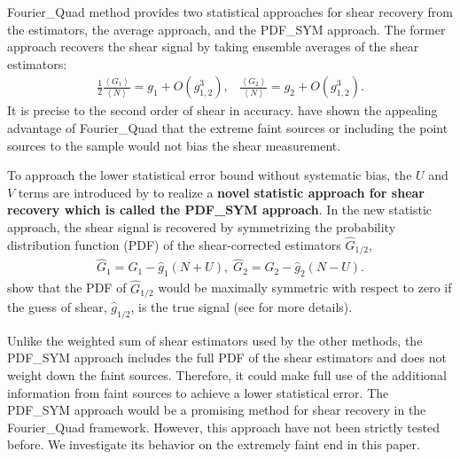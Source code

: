 \documentclass[twocolumn]{aastex62}
\begin{document}
Fourier\_Quad method provides two statistical approaches for shear recovery from the estimators, the average approach, and the PDF\_SYM approach. The former approach recovers the shear signal by taking ensemble averages of the shear estimators:
\begin{eqnarray}
\label{method:mean}
\frac{1}{2}\frac{\left\langle  G_1\right\rangle }{\left\langle  N\right\rangle }=g_1+O(g_{1,2}^3),\;\;\;\frac{\left\langle  G_2\right\rangle }{\left\langle  N\right\rangle }=g_2+O(g_{1,2}^3).
\end{eqnarray}
It is precise to the second order of shear in accuracy\citep{Zhang2015}. \cite{Zhang2015} have shown the appealing advantage of Fourier\_Quad that the extreme faint sources or including the point sources to the sample would not bias the shear measurement. 


To approach the lower statistical error bound without systematic bias, the $U$ and $V$ terms are introduced by \cite{Zhang2017} to realize a \textbf{novel statistic approach for shear recovery which is called the PDF\_SYM approach}. In the new statistic approach, the shear signal is recovered by symmetrizing the probability distribution function (PDF) of the shear-corrected estimators $\hat{G}_{1/2}$, 
\begin{eqnarray}
\label{method:pdf}
\hat{G}_{1} = G_1 - \hat{g}_{1}(N + U), \;
\hat{G}_{2} = G_2 - \hat{g}_{2}(N - U).
\end{eqnarray}
\cite{Zhang2017} show that the PDF of $\hat{G}_{1/2}$ would be maximally symmetric with respect to zero if the guess of shear, $\hat{g}_{1/2}$, is the true signal (see \cite{Zhang2017} for more details).


Unlike the weighted sum of shear estimators used by the other methods, the PDF\_SYM approach includes the full PDF of the shear estimators and does not weight down the faint sources. Therefore, it could make full use of the additional information from faint sources to achieve a lower statistical error. The PDF\_SYM approach would be a promising method for shear recovery in the Fourier\_Quad framework. However, this approach have not been strictly tested before. We investigate its behavior on the extremely faint end in this paper.
\end{document}
